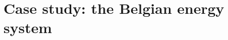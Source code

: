 \documentclass[a4paper,twoside,10pt,final]{memoir} %
\begin{document}
%

\clearemptydoublepage
\chapter{Case study: the Belgian energy system} 
\label{chap:case_study}

\clearpage

%


%

%


\end{document}
